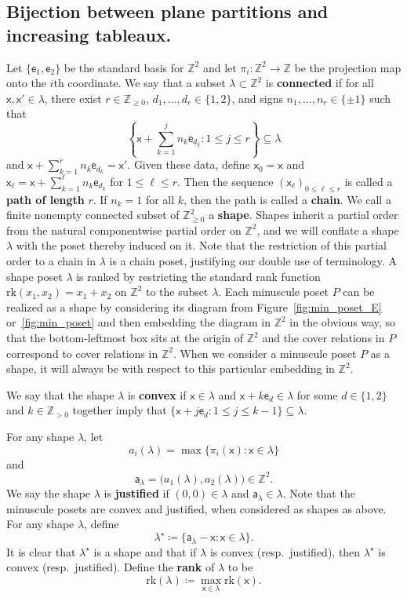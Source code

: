 \documentclass[12pt]{amsart}
\newcommand{\x}{\ensuremath{\mathsf{x}}}
\newcommand{\e}{\ensuremath{\mathsf{e}}}
\newcommand{\aaa}{\ensuremath{\mathsf{a}}}
\theoremstyle{definition}
\theoremstyle{remark}
\numberwithin{equation}{section}
\newcommand{\rank}{\ensuremath{\mathrm{rk}}}
\begin{document}
\subsection{Bijection between plane partitions and increasing tableaux.} 

Let $\{ \e_1, \e_2 \}$ be the standard basis for $\mathbb{Z}^{2}$ and let $\pi_i : \mathbb{Z}^{2} \to \mathbb{Z}$ be the projection map onto the $i$th coordinate. We say that a subset $\lambda \subset \mathbb{Z}^{2}$ is {\bf connected} if for all $\x,\x' \in \lambda$, there exist $r \in \mathbb{Z}_{\geq 0}$, $d_1, \ldots, d_r \in \{1, 2 \}$, and signs $n_1, \ldots, n_r \in \{ \pm 1 \}$ such that 
\[\left\{ \x + \sum_{k=1}^j n_k \e_{d_k} :  1\leq j \leq r \right\} \subseteq \lambda\]
 and $\x + \sum_{k=1}^r n_k \e_{d_k} = \x'$. Given these data, define $\x_0 = \x$ and $\x_\ell = \x + \sum_{k=1}^\ell n_k \e_{d_k}$ for $1 \leq \ell \leq r$. Then the sequence $\left( \x_\ell  \right)_{0 \leq \ell \leq r}$ is called a {\bf path of length} $r$. If $n_k = 1$ for all $k$, then the path is called a {\bf chain}. We call a finite nonempty connected subset of $\mathbb{Z}_{\geq 0}^2$ a {\bf shape}.  Shapes inherit a partial order from the natural componentwise partial order on $\mathbb{Z}^2$, and we will conflate a shape $\lambda$ with the poset thereby induced on it. Note that the restriction of this partial order to a chain in $\lambda$ is a chain poset, justifying our double use of terminology. A shape poset $\lambda$ is ranked by restricting the standard rank function $\text{rk}(x_1,x_2) = x_1 + x_2$ on $\mathbb{Z}^2$ to the subset $\lambda$. Each minuscule poset $P$ can be realized as a shape by considering its diagram from Figure~\ref{fig:min_poset_E} or~\ref{fig:min_poset} and then embedding the diagram in $\mathbb{Z}^2$ in the obvious way, so that the bottom-leftmost box sits at the origin of $\mathbb{Z}^2$ and the cover relations in $P$ correspond to cover relations in $\mathbb{Z}^2$. When we consider a minuscule poset $P$ as a shape, it will always be with respect to this particular embedding in $\mathbb{Z}^2$.

We say that the shape $\lambda$ is {\bf convex} if $\x\in \lambda$ and $\x + k  \e_d \in \lambda $ for some $d \in \{1, 2\}$ and $k \in \mathbb{Z}_{> 0}$ together imply  that $\{\x + j \e_d : 1 \leq j \leq k-1 \} \subseteq \lambda.$

For any shape $\lambda$, let \[a_i(\lambda) = \max \{ \pi_i(\x) \colon \x \in \lambda\}\] and \[\aaa_\lambda = \big(a_1(\lambda),a_{2}(\lambda)\big) \in \mathbb{Z}^2.\] We say the shape $\lambda$ is {\bf justified} if $(0,0) \in \lambda$ and $\aaa_{\lambda} \in \lambda$. Note that the minuscule posets are convex and justified, when considered as shapes as above. For any shape $\lambda$, define 
\[
\lambda^\star \coloneqq \lbrace \aaa_\lambda - \x: \x \in \lambda \rbrace.
\] It is clear that $\lambda^{\star}$ is a shape and that if $\lambda$ is convex (resp.\ justified), then $\lambda^\star$ is convex (resp.\ justified).  Define the {\bf rank} of $\lambda$ to be
\[ 
\rank(\lambda) \coloneqq \max_{\x \in \lambda} \rank(\x).
\]
\end{document}

